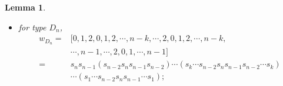 \documentclass[reqno,12pt]{amsart}
\numberwithin{equation}{section}
\theoremstyle{plain}
\newtheorem{Lem}[Thm]{Lemma}
\theoremstyle{definition}
\begin{document}
\begin{Lem}
\begin{itemize}
        \item for type $D_n$, 
        \begin{align*}
w_{D_{n}}=&[0,1,2,0,1,2,\cdots,n-k,\cdots,2,0,1,2,\cdots,n-k,\\
&\cdots,n-1,\cdots,2,0,1,\cdots,n-1]\\
=& s_ns_{n-1}(s_{n-2}s_ns_{n-1}s_{n-2})\cdots(s_k\cdots s_{n-2}s_ns_{n-1}s_{n-2}\cdots s_k)\\
&\cdots(s_1\cdots s_{n-2}s_n s_{n-1}\cdots s_{1});
        \end{align*}


        
   

\end{itemize}
\end{Lem}
\end{document}
